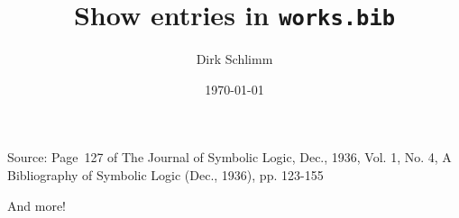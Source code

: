 \documentclass[12pt]{article}
\title{Show entries in \texttt{works.bib}}
\author{Dirk Schlimm}
\date{\today}
\begin{document}
\maketitle

Source: Page~127 of The Journal of Symbolic Logic, Dec., 1936, Vol. 1, No. 4, A Bibliography of Symbolic Logic (Dec., 1936), pp. 123-155

And more!

\nocite{*}


%


\end{document}
